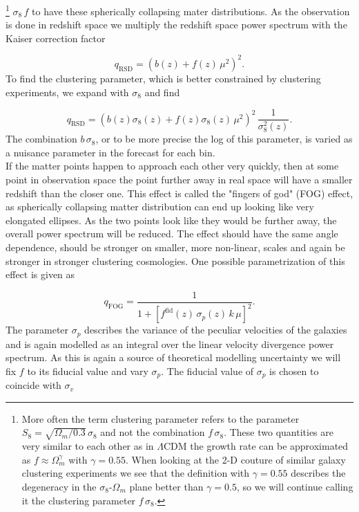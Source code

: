 \documentclass[../main.tex]{subfiles}
\begin{document}
\footnote{More often the term clustering parameter refers to the parameter $S_8 = \sqrt{\Omega_m/0.3}\, \sigma_8$ and not the combination $f\,\sigma_8$. These two quantities are very similar to each other as in $\Lambda$CDM the growth rate can be approximated as $f \approx \Omega_m^{\gamma}$ with $\gamma=0.55$. When looking at the 2-D couture of similar galaxy clustering experiments we see that the definition with $\gamma=0.55$ describes the degeneracy in the $\sigma_8$-$\Omega_m$ plane better than $\gamma=0.5$, so we will continue calling it the clustering parameter $f\,\sigma_8$.}
$\sigma_8\,f$ to have these spherically collapsing mater distributions. As the observation is done in redshift space we multiply the redshift space power spectrum with the Kaiser correction factor

\begin{equation}
    q_\mathrm{RSD} = \left(b(z) + f(z)\,\mu^2 \right)^2.
\end{equation}
To find the clustering parameter, which is better constrained by clustering experiments, we expand with $\sigma_8$ and find 

\begin{equation*}
    q_\mathrm{RSD} = \left(b(z) \sigma_8(z) + f(z) \sigma_8(z) \,\mu^2 \right)^2\,\frac{1}{\sigma_8^2(z)}.
\end{equation*}
The combination $b\,\sigma_8$, or to be more precise the log of this parameter, is varied as a nuisance parameter in the forecast for each bin.\\
If the matter points happen to approach each other very quickly, then at some point in observation space the point further away in real space will have a smaller redshift than the closer one. This effect is called the "fingers of god" (FOG) effect, as spherically collapsing matter distribution can end up looking like very elongated ellipses. As the two points look like they would be further away, the overall power spectrum will be reduced. The effect should have the same angle dependence, should be stronger on smaller, more non-linear, scales and again be stronger in stronger clustering cosmologies. One possible parametrization of this effect is given as 

\begin{equation}
q_\mathrm{FOG} = \frac{1}{1+\left[f^\mathrm{fid}(z)\,\sigma_p(z)\,k\,\mu\right]^2}.   
\end{equation}
The parameter $\sigma_p$ describes the variance of the peculiar velocities of the galaxies and is again modelled as an integral over the linear velocity divergence power spectrum. As this is again a source of theoretical modelling uncertainty we will fix $f$ to its fiducial value and vary $\sigma_p$. The fiducial value of $\sigma_p$ is chosen to coincide with $\sigma_v$
\end{document}

